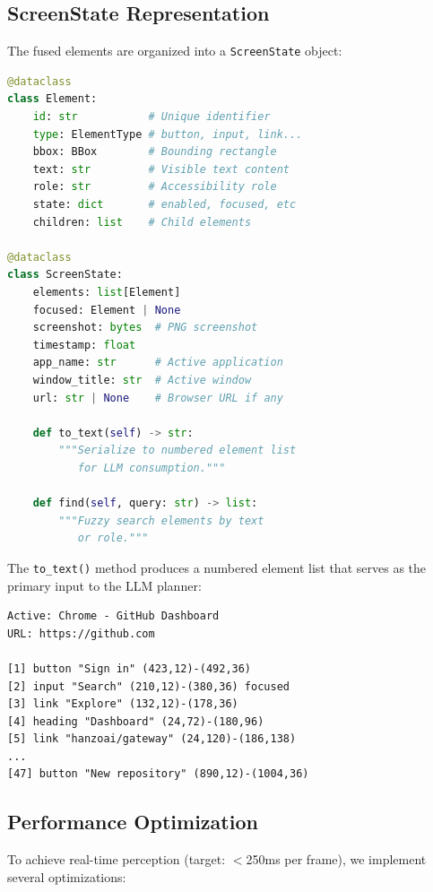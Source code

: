 \subsection{ScreenState Representation}

The fused elements are organized into a \texttt{ScreenState} object:

\begin{lstlisting}[language=Python, caption=ScreenState data structure]
@dataclass
class Element:
    id: str           # Unique identifier
    type: ElementType # button, input, link...
    bbox: BBox        # Bounding rectangle
    text: str         # Visible text content
    role: str         # Accessibility role
    state: dict       # enabled, focused, etc
    children: list    # Child elements

@dataclass
class ScreenState:
    elements: list[Element]
    focused: Element | None
    screenshot: bytes  # PNG screenshot
    timestamp: float
    app_name: str      # Active application
    window_title: str  # Active window
    url: str | None    # Browser URL if any

    def to_text(self) -> str:
        """Serialize to numbered element list
           for LLM consumption."""

    def find(self, query: str) -> list:
        """Fuzzy search elements by text
           or role."""
\end{lstlisting}

The \texttt{to\_text()} method produces a numbered element list that serves as the primary input to the LLM planner:

\begin{lstlisting}[caption=Example ScreenState text representation]
Active: Chrome - GitHub Dashboard
URL: https://github.com

[1] button "Sign in" (423,12)-(492,36)
[2] input "Search" (210,12)-(380,36) focused
[3] link "Explore" (132,12)-(178,36)
[4] heading "Dashboard" (24,72)-(180,96)
[5] link "hanzoai/gateway" (24,120)-(186,138)
...
[47] button "New repository" (890,12)-(1004,36)
\end{lstlisting}

\subsection{Performance Optimization}

To achieve real-time perception (target: $<$250ms per frame), we implement several optimizations:

